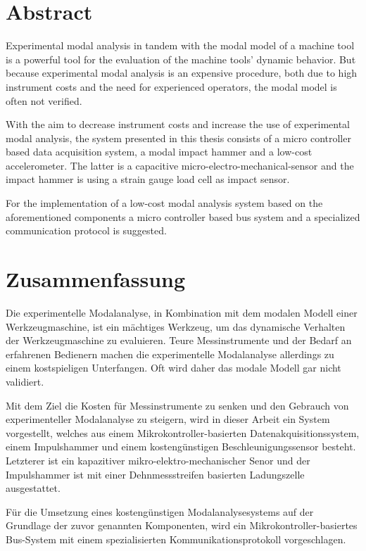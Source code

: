\chapter*{Abstract}

Experimental modal analysis in tandem with the modal model of a machine tool is a powerful tool for the evaluation of the machine tools' dynamic behavior. But because experimental modal analysis is an expensive procedure, both due to high instrument costs and the need for experienced operators, the modal model is often not verified.

With the aim to decrease instrument costs and increase the use of experimental modal analysis, the system presented in this thesis consists of a micro controller based data acquisition system, a modal impact hammer and a low-cost accelerometer. The latter is a capacitive micro-electro-mechanical-sensor and the impact hammer is using a strain gauge load cell as impact sensor. 

For the implementation of a low-cost modal analysis system based on the aforementioned components a micro controller based bus system and a specialized communication protocol is suggested.

\cleardoublepage
\chapter*{Zusammenfassung}

Die experimentelle Modalanalyse, in Kombination mit dem modalen Modell einer Werkzeugmaschine, ist ein mächtiges Werkzeug, um das dynamische Verhalten der Werkzeugmaschine zu evaluieren. Teure Messinstrumente und der Bedarf an erfahrenen Bedienern machen die experimentelle Modalanalyse allerdings zu einem kostspieligen Unterfangen. Oft wird daher das modale Modell gar nicht validiert.

Mit dem Ziel die Kosten für Messinstrumente zu senken und den Gebrauch von experimenteller Modalanalyse zu steigern, wird in dieser Arbeit ein System vorgestellt, welches aus einem Mikrokontroller-basierten Datenakquisitionssystem, einem Impulshammer und einem kostengünstigen Beschleunigungssensor besteht. Letzterer ist ein kapazitiver mikro-elektro-mechanischer Senor und der Impulshammer ist mit einer Dehnmessstreifen basierten Ladungszelle ausgestattet.

Für die Umsetzung eines kostengünstigen Modalanalysesystems auf der Grundlage der zuvor genannten Komponenten, wird ein Mikrokontroller-basiertes Bus-System mit einem spezialisierten Kommunikationsprotokoll vorgeschlagen.